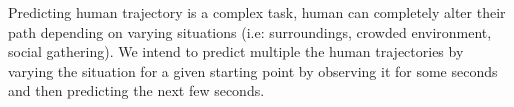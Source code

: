 Predicting human trajectory is a complex task, human can completely alter their path depending on varying situations (i.e: surroundings, crowded environment, social gathering).\newline
We intend to predict multiple the human trajectories by varying the situation for a given starting point by observing it for some seconds and then predicting the next few seconds.